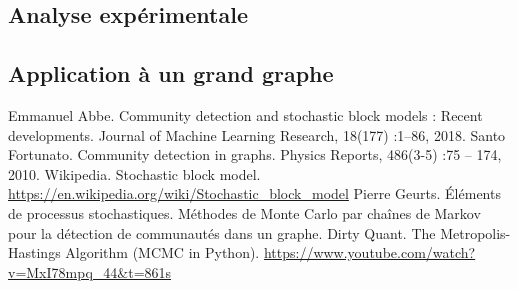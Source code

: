 \documentclass[11pt]{article}
\begin{document}
\newpage
\subsection{Analyse expérimentale}


\subsection{Application à un grand graphe}


\newpage
\begin{thebibliography}{widest entry}
  \bibitem[Abb18]{} Emmanuel Abbe. Community detection and stochastic block models : Recent developments. Journal of Machine Learning Research, 18(177) :1–86, 2018.
  \bibitem[For10]{} Santo Fortunato. Community detection in graphs. Physics Reports, 486(3-5) :75 – 174, 2010.
  \bibitem[Wik22]{} Wikipedia. Stochastic block model. \url{https://en.wikipedia.org/wiki/Stochastic_block_model}
  \bibitem[Geu22]{} Pierre Geurts. Éléments de processus stochastiques. Méthodes de Monte Carlo par chaînes de Markov pour la détection de communautés dans un graphe.
  \bibitem[Qua22]{} Dirty Quant. The Metropolis-Hastings Algorithm (MCMC in Python). \url{https://www.youtube.com/watch?v=MxI78mpq_44&t=861s}
\end{thebibliography}
\end{document}
